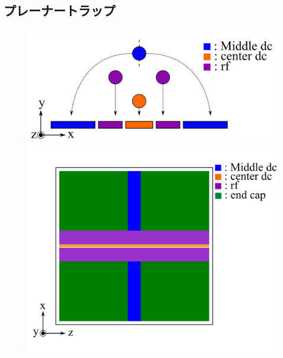 \subsection{プレーナートラップ}
\begin{figure}[h]
	\begin{center}
		\begin{minipage}{0.48\linewidth}
			\begin{center}
			\includegraphics[width = 0.98\columnwidth]{./theory/figure/PaulTrap_3Dto2D_3DTrap.png}
			\end{center}
		\end{minipage}
		\begin{minipage}{0.48\linewidth}
			\begin{center}
			\includegraphics[width = 0.98\columnwidth]{./theory/figure/PaulTrap_3Dto2D_2DTrap.png}
			\end{center}
		\end{minipage}
	\end{center}
\end{figure}
